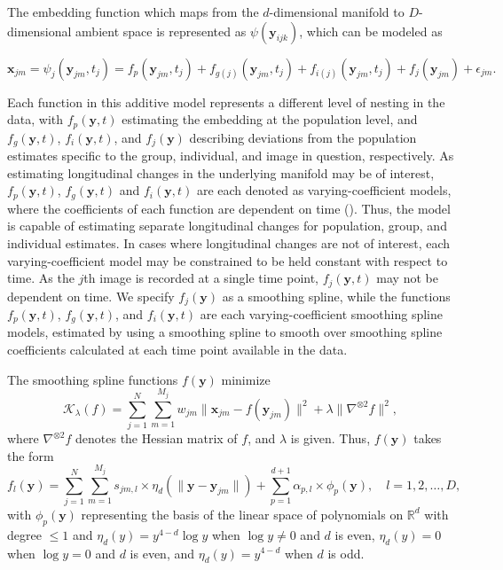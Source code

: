 \documentclass[11pt,reqno]{article}
\theoremstyle{definition}
\begin{document}
The embedding function which maps from the $d$-dimensional manifold to $D$-dimensional ambient space is represented as $\psi(\mathbf{y}_{ijk})$, which can be modeled as 

\begin{equation}
  \mathbf{x}_{jm} = \psi_j(\mathbf{y}_{jm}, t_j) = f_p(\mathbf{y}_{jm}, t_{j}) + f_{g(j)}(\mathbf{y}_{jm}, t_{j}) + f_{i(j)}(\mathbf{y}_{jm}, t_{j}) + f_j(\mathbf{y}_{jm}) + \epsilon_{jm}. \label{eq:2}
\end{equation}

Each function in this additive model represents a different level of nesting in the data, with $f_p(\mathbf{y}, t)$ estimating the embedding at the population level, and $f_g(\mathbf{y}, t)$, $f_i(\mathbf{y}, t)$, and $f_{j}(\mathbf{y})$ describing deviations from the population estimates specific to the group, individual, and image in question, respectively. As estimating longitudinal changes in the underlying manifold may be of interest, $f_p(\mathbf{y}, t)$, $f_g(\mathbf{y}, t)$ and $f_i(\mathbf{y}, t)$ are each denoted as varying-coefficient models, where the coefficients of each function are dependent on time (\cite{hastieVaryingCoefficientModels1993}). Thus, the model is capable of estimating separate longitudinal changes for population, group, and individual estimates. In cases where longitudinal changes are not of interest, each varying-coefficient model may be constrained to be held constant with respect to time. As the $j$th image is recorded at a single time point, $f_{j}(\mathbf{y}, t)$ may not be dependent on time. We specify $f_{j}(\mathbf{y})$ as a smoothing spline, while the functions $f_p(\mathbf{y}, t)$, $f_g(\mathbf{y}, t)$, and $f_i(\mathbf{y}, t)$ are each varying-coefficient smoothing spline models, estimated by using a smoothing spline to smooth over smoothing spline coefficients calculated at each time point available in the data. 

The smoothing spline functions $f(\mathbf{y})$ minimize 
\[%
  \mathcal{K}_{\lambda}(f) = \sum_{j=1}^{N}\sum_{m=1}^{M_j}w_{jm}\|\mathbf{x}_{jm} - f(\mathbf{y}_{jm})\|^2 + \lambda\|\nabla^{\otimes 2}f\|^2
,\]%
where $\nabla^{\otimes 2}f$ denotes the Hessian matrix of $f$, and $\lambda$ is given. Thus, $f(\mathbf{y})$ takes the form
\begin{equation}
  f_l(\mathbf{y}) = \sum_{j=1}^{N}\sum_{m=1}^{M_j}s_{jm, l} \times \eta_{d}\left(\|\mathbf{y} - \mathbf{y}_{jm}\|\right) + \sum_{p = 1}^{d + 1}\alpha_{p, l} \times \phi_{p}(\mathbf{y}), \quad l = 1, 2, \dots, D, \label{eq:3}
\end{equation}
with $\phi_p(\mathbf{y})$ representing the basis of the linear space of polynomials on $\mathbb{R}^{d}$ with degree $\leq 1$ and $\eta_{d}(y) = y^{4-d}\log y$ when $\log y \neq 0$ and $d$ is even, $\eta_{d}(y) = 0$ when $\log y = 0$ and $d$ is even, and $\eta_{d}(y) = y^{4-d}$ when $d$ is odd. 
\end{document}
